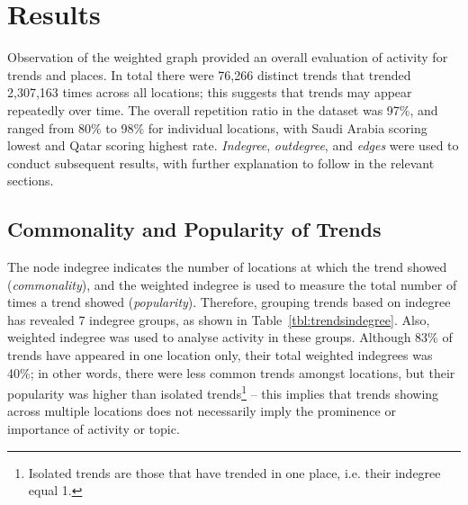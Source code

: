 \documentclass{llncs}
\begin{document}

\section{Results}\label{results}

Observation of the weighted graph provided an overall evaluation of
activity for trends and places. In total there were 76,266 distinct
trends that trended 2,307,163 times across all locations; this
suggests that trends may appear repeatedly over time. The overall
repetition ratio in the dataset was 97\%, and ranged from 80\% to 98\%
for individual locations, with Saudi Arabia scoring lowest and Qatar
scoring highest rate. {\emph{Indegree}}, {\emph{outdegree}}, and
{\emph{edges}} were used to conduct subsequent results, with further
explanation to follow in the relevant sections.

\subsection{Commonality and Popularity of Trends}

The node indegree indicates the number of locations at which the trend
showed ({\emph{commonality}}), and the weighted indegree is used to
measure the total number of times a trend showed
({\emph{popularity}}). Therefore, grouping trends based on indegree
has revealed 7 indegree groups, as shown in
Table~\ref{tbl:trendsindegree}.  Also, weighted indegree was used to
analyse activity in these groups.  Although 83\% of trends have
appeared in one location only, their total weighted indegrees was
40\%; in other words, there were less common trends amongst locations,
but their popularity was higher than isolated trends\footnote{Isolated
trends are those that have trended in one place, i.e. their indegree
equal 1.} -- this implies that trends showing across multiple
locations does not necessarily imply the prominence or importance of
activity or topic.
\end{document}
